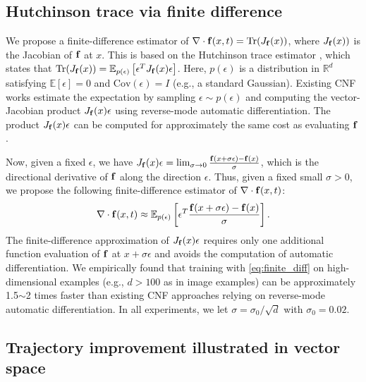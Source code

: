 \documentclass{article}
\theoremstyle{remark}
\theoremstyle{plain}
\newcommand{\R}{\mathbb{R}}
\newcommand{\E}{\mathbb{E}}
\newcommand{\revold}[1]{{\color{black}#1}}
\begin{document}
{\revold{
\subsection{Hutchinson trace 
via finite difference}\label{app:finite-diff}


We propose a finite-difference estimator of $\nabla \cdot {\bf f}(x,t) = \text{Tr}(J_{{\bf f}}(x))$, where $J_{{\bf f}}(x))$ is the Jacobian of $\bf f$ at $x$. This is based on the Hutchinson trace estimator \citep{Hutchinson1989ASE}, which states that $\text{Tr}(J_{{\bf f}}(x)) = \E_{p(\epsilon)} \left[ \epsilon^T J_{{\bf f}}(x) \epsilon\right]$. Here, $p(\epsilon)$ is a distribution in $\R^d$ satisfying $\E[\epsilon]=0$ and $\text{Cov}(\epsilon)=I$ (e.g., a standard Gaussian). Existing CNF works estimate the expectation by sampling $\epsilon \sim p(\epsilon)$ and computing the vector-Jacobian product $J_{{\bf f}}(x) \epsilon$ using reverse-mode automatic differentiation. The product $J_{{\bf f}}(x) \epsilon$ can be computed for approximately the same cost as evaluating $\bf f$ \citep{FFJORD}.

Now, given a fixed $\epsilon$, 
we have $J_{{\bf f}}(x) \epsilon = \lim_{\sigma \rightarrow 0} \frac{{\bf f}(x+\sigma\epsilon)-{\bf f}(x)}{\sigma}$,
which is the directional derivative of ${\bf f}$ along the direction $\epsilon$. Thus, given a fixed small $\sigma > 0$, we propose the following finite-difference estimator of $\nabla \cdot {\bf f}(x,t)$:
\begin{equation}\label{eq:finite_diff}
    \nabla \cdot {\bf f}(x,t) \approx \E_{p(\epsilon)} \left[ \epsilon^T \frac{{\bf f}(x+\sigma\epsilon)-{\bf f}(x)}{\sigma}\right].
\end{equation}
The finite-difference approximation of $J_{{\bf f}}(x) \epsilon$ requires only one additional function evaluation of ${\bf f}$ at $x+\sigma \epsilon$ and avoids the computation of automatic differentiation. 
We empirically found that training with \eqref{eq:finite_diff} on high-dimensional examples (e.g., $d>100$ as in image examples) can be approximately 1.5$\sim$2 times faster than existing CNF approaches relying on reverse-mode automatic differentiation.
% 
In all experiments, we let $\sigma=\sigma_0/\sqrt{d}$ with $\sigma_0=0.02$.
}




\subsection{
Trajectory improvement illustrated in vector space}\label{app:traj_comp_detail}


}
\end{document}
